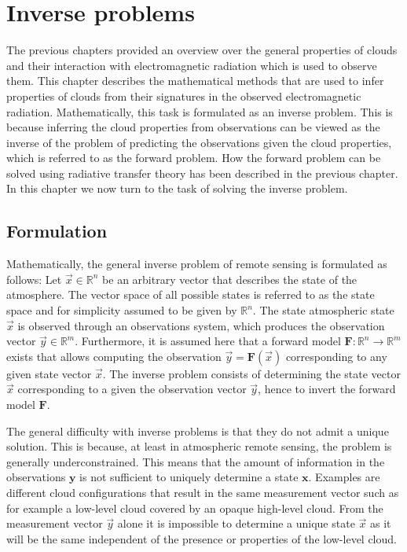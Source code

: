 %
\chapter{Inverse problems}
\label{ch:inverse_problems}

The previous chapters provided an overview over the general properties of clouds
and their interaction with electromagnetic radiation which is used to observe
them. This chapter describes the mathematical methods that are used to infer
properties of clouds from their signatures in the observed electromagnetic
radiation. Mathematically, this task is formulated as an inverse problem. This
is because inferring the cloud properties from observations can be viewed as the
inverse of the problem of predicting the observations given the cloud
properties, which is referred to as the forward problem. How the forward problem
can be solved using radiative transfer theory has been described in the previous
chapter. In this chapter we now turn to the task of solving the inverse problem.

\section{Formulation}

Mathematically, the general inverse problem of remote sensing is formulated as
follows: Let $\vec{x} \in \mathbb{R}^n$ be an arbitrary vector that describes
the state of the atmosphere. The vector space of all possible states is referred
to as the state space and for simplicity assumed to be given by $\mathbb{R}^n$.
The state atmospheric state $\vec{x}$ is observed through an observations
system, which produces the observation vector $\vec{y} \in \mathbb{R}^m$.
Furthermore, it is assumed here that a forward model $\mathbf{F}: \mathbb{R}^n
\rightarrow \mathbb{R}^m$ exists that allows computing the observation $\vec{y}
= \mathbf{F}(\vec{x})$ corresponding to any given state vector $\vec{x}$. The
inverse problem consists of determining the state vector $\vec{x}$ corresponding
to a given the observation vector $\vec{y}$, hence to invert the forward model
$\mathbf{F}$.

The general difficulty with inverse problems is that they do not admit
a unique solution. This is because, at least in atmospheric remote sensing, the
problem is generally underconstrained. This means that the amount of information
in the observations $\mathbf{y}$ is not sufficient to uniquely determine a state
$\mathbf{x}$. Examples are different cloud configurations that result in the
same measurement vector such as for example a low-level cloud covered by an
opaque high-level cloud. From the measurement vector $\vec{y}$ alone it is
impossible to determine a unique state $\vec{x}$ as it will be the same
independent of the presence or properties of the low-level cloud.

